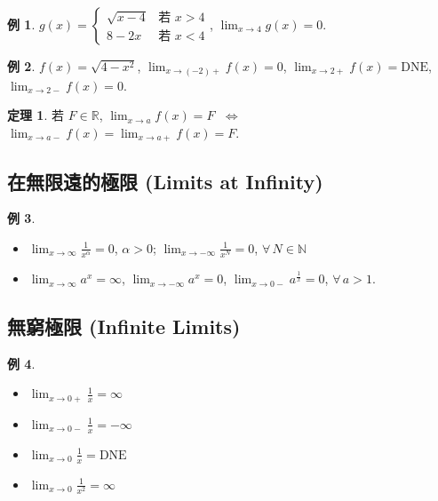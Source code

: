 \documentclass[12pt,a4paper]{extarticle}
\newcommand{\ds}{\displaystyle}
\newcommand{\ifff}{\;\Longleftrightarrow\;}
\theoremstyle{definition}
\newtheorem*{thm}{定理}
\newtheorem*{ex}{例}
\begin{document}
\vspace{-12mm}

\begin{ex}
  $\ds g(x) = \begin{cases}\sqrt{x - 4} & \text{若 } x > 4 \\ 8 - 2x & \text{若 } x < 4 \end{cases}$, $\ds\lim_{x\to 4}g(x) = 0$. 
\end{ex}

\begin{ex}
  $\ds f(x) = \sqrt{4 - x^2}$, $\ds\lim_{x\to(-2)+}f(x) = 0$, $\ds\lim_{x\to2+}f(x) = \text{DNE}$, $\ds\lim_{x\to2-}f(x) = 0$. 
\end{ex}

\begin{thm}
  若 $F\in\mathbb{R}$, $\ds\lim_{x\to a}f(x) = F$ $\ifff$ $\ds\lim_{x\to a-} f(x) = \ds\lim_{x\to a+} f(x) = F$. 
\end{thm}

\subsection*{在無限遠的極限 (Limits at Infinity) }
\begin{ex}
  \begin{multicols}{2}
    \begin{itemize}\setlength\itemsep{0em}
      \item $\ds\lim_{x\to\infty}\frac{1}{x^\alpha} = 0$, $\alpha > 0$; $\ds\lim_{x\to-\infty}\frac{1}{x^N} = 0$, $\forall\,N\in\mathbb{N}$
      \item $\ds\lim_{x\to\infty}a^x = \infty$, $\ds\lim_{x\to-\infty}a^x = 0$, $\ds\lim_{x\to0-}a^{\frac{1}{x}} = 0$, $\forall\,a > 1$. 
    \end{itemize}
  \end{multicols}
\end{ex}

\subsection*{無窮極限 (Infinite Limits) }
\begin{ex}
  \setlength{\columnsep}{-20mm}
  \begin{multicols}{4}
    \begin{itemize}\setlength\itemsep{0em}
      \item $\ds\lim_{x\to0+}\frac{1}{x} = \infty$
      \item $\ds\lim_{x\to0-}\frac{1}{x} = -\infty$
      \item $\ds\lim_{x\to0}\frac{1}{x} = \text{DNE}$
      \item $\ds\lim_{x\to0}\frac{1}{x^2} = \infty$
    \end{itemize}
  \end{multicols}
\end{ex}
\end{document}
